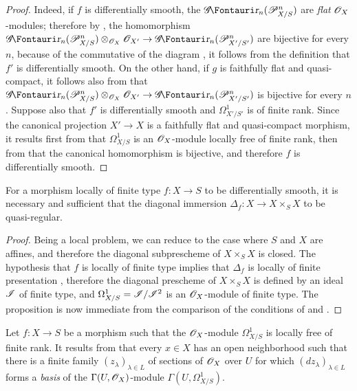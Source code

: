 \begin{proof}
Indeed, if $f$ is differentially smooth, the $\shGr_n(\sh{P}_{X/S}^n)$ are \emph{flat} $\mathscr{O}_X$-modules;
therefore by , the homomorphism $\shGr_n(\sh{P}_{X/S}^n) \otimes_{\sh{O}_X} \sh{O}_{X'} \to \shGr_n(\sh{P}_{X'/S'}^n)$ are bijective for every $n$, because of the commutative of the diagram , it follows from the definition  that $f'$ is differentially smooth.
On the other hand, if $g$ is faithfully flat and quasi-compact, it follows also from  that $\shGr_n(\sh{P}_{X/S}^n) \otimes_{\sh{O}_X} \sh{O}_{X'} \to \shGr_n(\sh{P}_{X'/S'}^n)$ is bijective for every $n$.
Suppose also that $f'$ is differentially smooth and $\Omega_{X'/S'}^1$ is of finite rank.
Since the canonical projection $X' \to X$ is a faithfully flat and quasi-compact morphism, it results first from  that $\Omega_{X/S}^1$ is an $\mathscr{O}_X$-module locally free of finite rank, then from  that the canonical homomorphism  is bijective, and therefore $f$ is differentially smooth.
\end{proof}

\begin{proposition}[16.10.5]
\label{IV.16.10.5}
For a morphism locally of finite type $f:X \to S$ to be differentially smooth, it is necessary and sufficient that the diagonal immersion $\Delta_f:X \to X \times_S X$ to be quasi-regular.
\end{proposition}
  

\begin{proof}
Being a local problem, we can reduce to the case where $S$ and $X$ are affines, and therefore the diagonal subprescheme of $X \times_S X$ is closed.
The hypothesis that $f$ is locally of finite type implies that $\Delta_f$ is locally of finite presentation , therefore the diagonal prescheme of $X \times_S X$ is defined by an ideal $\mathscr{I}$ of finite type, and $\Omega_{X/S}^1 = \mathscr{I}/\mathscr{I}^2$ is an $\mathscr{O}_X$-module of finite type.
The proposition is now immediate from the comparison of the conditions of  and . 
\end{proof}

\begin{remark}[16.10.6]
\label{IV.16.10.6}
Let $f:X \to S$ be a morphism such that the $\mathscr{O}_X$-module $\Omega_{X/S}^1$ is locally free of finite rank.
It results from  that every $x \in X$ has an open neighborhood such that there is a finite family $(z_\lambda)_{\lambda \in L}$ of sections of $\mathscr{O}_X$ over $U$ for which $(dz_\lambda)_{\lambda \in L}$ forms a \emph{basis} of the $\Gamma(U, \mathscr{O}_X)$-module $\Gamma(U, \Omega_{X/S}^1)$.
\end{remark}

